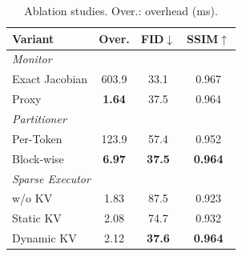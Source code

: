 \begin{table}
\vspace{-12pt}
\centering
\caption{Ablation studies. Over.: overhead (ms).}
\label{tab:ablation}
\footnotesize
\setlength{\tabcolsep}{3pt}
\renewcommand{\arraystretch}{0.95}
\begin{tabular}{@{}l c c c@{}}
\toprule
\textbf{Variant} & \textbf{Over.} & \textbf{FID}$\downarrow$ & \textbf{SSIM}$\uparrow$ \\
\midrule
\multicolumn{4}{l}{\footnotesize\itshape Monitor} \\
\quad Exact Jacobian & 603.9 & 33.1 & 0.967 \\
\rowcolor{lightbluerow}
\quad Proxy & \textbf{1.64} & 37.5 & 0.964 \\
\midrule
\multicolumn{4}{l}{\footnotesize\itshape Partitioner} \\
\quad Per-Token & 123.9 & 57.4 & 0.952 \\
\rowcolor{lightbluerow}
\quad Block-wise & \textbf{6.97} & \textbf{37.5} & \textbf{0.964} \\
\midrule
\multicolumn{4}{l}{\footnotesize\itshape Sparse Executor} \\
\quad w/o KV & 1.83 & 87.5 & 0.923 \\
\quad Static KV & 2.08 & 74.7 & 0.932 \\
\rowcolor{lightbluerow}
\quad Dynamic KV & 2.12 & \textbf{37.6} & \textbf{0.964} \\
\bottomrule
\end{tabular}
\vspace{-10pt}
\end{table}

